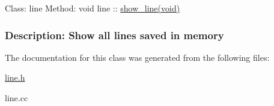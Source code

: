  Class\-: line Method\-: void line \-:\-: \hyperlink{classline_aee425c3dfb103b45b468693e85fbaa30}{show\-\_\-line(void)} \subsubsection*{Description\-: Show all lines saved in memory }

The documentation for this class was generated from the following files\-:\begin{DoxyCompactItemize}
\item 
\hyperlink{line_8h}{line.\-h}\item 
line.\-cc\end{DoxyCompactItemize}
